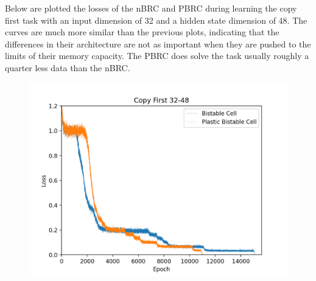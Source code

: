 \clearpage
Below are plotted the losses of the nBRC and PBRC during learning the copy first task with an input dimension of 32 and a hidden state dimension of 48. The curves are much more similar than the previous plots, indicating that the differences in their architecture are not as important when they are pushed to the limits of their memory capacity. The PBRC does solve the task usually roughly a quarter less data than the nBRC.
\begin{figure}[h]
	\centering
	\includegraphics[width=5in]{plots/32_48_plot}
\end{figure}